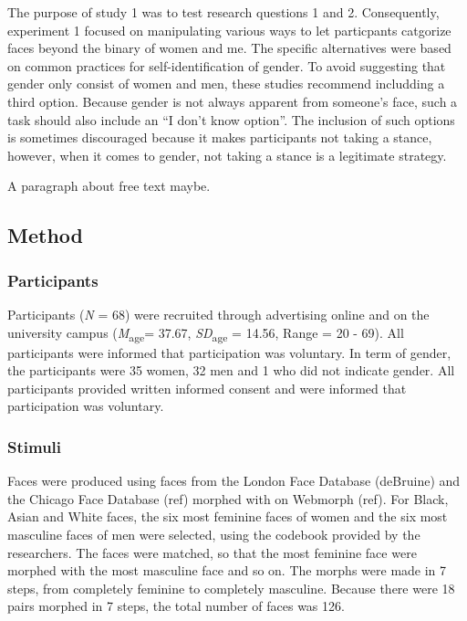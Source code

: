 \documentclass[
  man]{apa7}
\begin{document}
The purpose of study 1 was to test research questions 1 and 2. Consequently, experiment 1 focused on manipulating various ways to let particpants catgorize faces beyond the binary of women and me. The specific alternatives were based on common practices for self-identification of gender. To avoid suggesting that gender only consist of women and men, these studies recommend includding a third option. Because gender is not always apparent from someone's face, such a task should also include an ``I don't know option''. The inclusion of such options is sometimes discouraged because it makes participants not taking a stance, however, when it comes to gender, not taking a stance is a legitimate strategy.

A paragraph about free text maybe.

\hypertarget{method}{%
\subsection{Method}\label{method}}

\hypertarget{participants}{%
\subsubsection{Participants}\label{participants}}

Participants (\emph{N} = 68) were recruited through advertising online and on the university campus (\emph{M}\textsubscript{age}= 37.67, \emph{SD}\textsubscript{age} = 14.56, Range = 20 - 69). All participants were informed that participation was voluntary. In term of gender, the participants were 35 women, 32 men and 1 who did not indicate gender. All participants provided written informed consent and were informed that participation was voluntary.

\hypertarget{stimuli}{%
\subsubsection{Stimuli}\label{stimuli}}

Faces were produced using faces from the London Face Database (deBruine) and the Chicago Face Database (ref) morphed with on Webmorph (ref). For Black, Asian and White faces, the six most feminine faces of women and the six most masculine faces of men were selected, using the codebook provided by the researchers. The faces were matched, so that the most feminine face were morphed with the most masculine face and so on. The morphs were made in 7 steps, from completely feminine to completely masculine. Because there were 18 pairs morphed in 7 steps, the total number of faces was 126.
\end{document}
